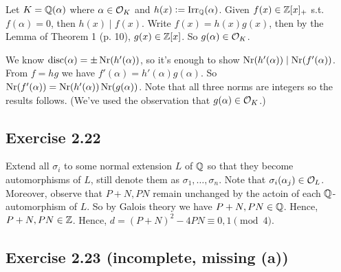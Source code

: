 \documentclass[../Marcus.tex]{subfiles}
\begin{document}
Let $K=\mathbb{Q}(\alpha)$ where $\alpha\in\mathcal{O}_K$ and $h(x):=\operatorname{Irr}_{\mathbb{Q}}(\alpha)$. Given $f(x)\in\mathbb{Z}[x]_+$ s.t. $f(\alpha)=0$, then $h(x)\mid f(x)$. Write $f(x)=h(x)g(x)$, then by the Lemma of Theorem 1 (p. 10), $g(x)\in\mathbb{Z}[x]$. So $g(\alpha)\in\mathcal{O}_K$.

We know $\operatorname{disc}(\alpha)=\pm \operatorname{Nr}(h'(\alpha))$, so it's enough to show $\operatorname{Nr}(h'(\alpha))\mid\operatorname{Nr}(f'(\alpha))$. From $f=hg$ we have $f'(\alpha)=h'(\alpha)g(\alpha)$. So $\operatorname{Nr}(f'(\alpha))=\operatorname{Nr}(h'(\alpha))\operatorname{Nr}(g(\alpha))$. Note that all three norms are integers so the results follows. (We've used the observation that $g(\alpha)\in\mathcal{O}_K$.)

\subsection*{Exercise 2.22}

Extend all $\sigma_i$ to some normal extension $L$ of $\mathbb{Q}$ so that they become automorphisms of $L$, still denote them as $\sigma_1,\ldots,\sigma_n$. Note that $\sigma_i(\alpha_j)\in \mathcal{O}_L$. Moreover, observe that $P+N,PN$ remain unchanged by the actoin of each $\mathbb{Q}$-automorphism of $L$. So by Galois theory we have $P+N,PN\in\mathbb{Q}$. Hence, $P+N,PN\in\mathbb{Z}$. Hence, $d=(P+N)^2-4PN \equiv 0,1 \pmod{4}$.

\subsection*{Exercise 2.23 \color{red}(incomplete, missing (a))}
\end{document}
